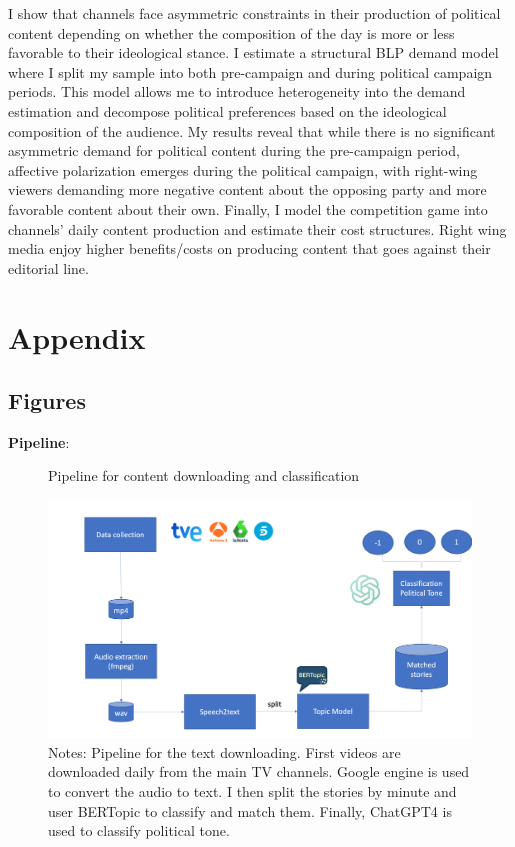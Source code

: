 \documentclass[12pt]{article}
\begin{document}
	I show that channels face asymmetric constraints  in their production of political content depending on whether the composition of the day is more or less favorable to their ideological stance. I estimate a structural BLP demand model where I split my sample into both pre-campaign and during political campaign periods. This model allows me to introduce heterogeneity into the demand estimation and decompose political preferences based on the  ideological composition of the audience. My results reveal that while there is no significant asymmetric demand for political content during the pre-campaign period, affective polarization emerges during the political campaign, with right-wing viewers demanding more negative content about the opposing party and more favorable content about their own. Finally, I model the competition game into channels' daily content production and estimate their cost structures. Right wing media enjoy higher benefits/costs on producing content that goes against their editorial line.
	
	
	
	
	
	\clearpage
	
	\section{Appendix}
	
	
	
	
	
	
	
	
	
	
	\subsection{Figures}
	
	
	
	\textbf{Pipeline}:
	
	\begin{figure}[H]
		\centering
		\caption{Pipeline for content downloading and classification }
		\includegraphics[width=150mm]{figures/pipeline3}
		\caption*{\small Notes: Pipeline for the text downloading. First videos are downloaded daily from the main TV channels. Google engine is used to convert the audio to text. I then split the stories by minute and user BERTopic to classify and match them. Finally, ChatGPT4 is used to classify political tone.}
		\label{fig:pipeline}
	\end{figure}
	
\end{document}
